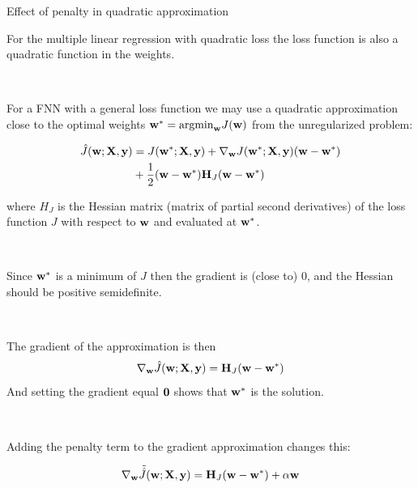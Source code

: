 \documentclass[
  ignorenonframetext,
]{beamer}
\begin{document}
\begin{frame}
\begin{block}{Effect of penalty in quadratic approximation}
\protect\hypertarget{effect-of-penalty-in-quadratic-approximation}{}
\(~\)

For the multiple linear regression with quadratic loss the loss function
is also a quadratic function in the weights.

\(~\)

For a FNN with a general loss function we may use a quadratic
approximation close to the optimal weights
\({\bf w}^*=\text{argmin}_{\bf w} J({\bf w})\) from the unregularized
problem:

\begin{align*}\hat{J}({\bf w}; {\bf X}, {\bf y})&= J({\bf w}^*; {\bf X}, {\bf y})+\nabla_{\bf w} J({\bf w}^*; {\bf X}, {\bf y})({\bf w}-{\bf w}^*)\\
&+\frac{1}{2} ({\bf w}-{\bf w}^*){\bf H}_J({\bf w}-{\bf w}^*)
\end{align*}

where \(H_J\) is the Hessian matrix (matrix of partial second
derivatives) of the loss function \(J\) with respect to \({\bf w}\) and
evaluated at \({\bf w}^*\).
\end{block}
\end{frame}

\begin{frame}
\(~\)

Since \({\bf w}^*\) is a minimum of \(J\) then the gradient is (close
to) 0, and the Hessian should be positive semidefinite.

\(~\)

The gradient of the approximation is then
\[\nabla_{\bf w} \hat{J}({\bf w}; {\bf X}, {\bf y})={\bf H}_J({\bf w}-{\bf w}^*)\]
And setting the gradient equal \({\bf 0}\) shows that \({\bf w}^*\) is
the solution.

\(~\)

Adding the penalty term to the gradient approximation changes this:

\[\nabla_{\bf w} \tilde{\hat{J}}({\bf w}; {\bf X}, {\bf y})={\bf H}_J({\bf w}-{\bf w}^*)+\alpha {\bf w}\]
\end{frame}
\end{document}
